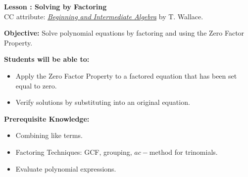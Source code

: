 \documentclass[12pt]{article}
\theoremstyle{definition}
\begin{document}
{\bf \large Lesson : Solving by Factoring}
\\ CC attribute: \href{http://www.wallace.ccfaculty.org/book/book.html}{\it{Beginning and Intermediate Algebra}} by T. Wallace. 
\hfill \doclicenseImage[imagewidth=5em]\\
\par
{\bf Objective:} Solve polynomial equations by factoring and using the Zero Factor Property.\\
\par
{\bf Students will be able to:}
\begin{itemize}
	\item Apply the Zero Factor Property to a factored equation that has been set equal to zero.
	\item Verify solutions by substituting into an original equation.
\end{itemize}
{\bf Prerequisite Knowledge:}
\begin{itemize}
	\item Combining like terms.
	\item Factoring Techniques: GCF, grouping, $ac-$method for trinomials.
	\item Evaluate polynomial expressions.
\end{itemize}
\hrulefill
\end{document}
